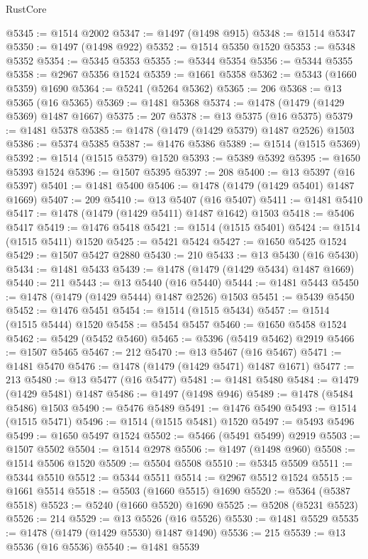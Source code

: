 \begin{lexlean}{RustCore}
\begin{coremodule}
@5345 := @1514 @2002
@5347 := @1497 (@1498 @915)
@5348 := @1514 @5347
@5350 := @1497 (@1498 @922)
@5352 := @1514 @5350 @1520
@5353 := @5348 @5352
@5354 := @5345 @5353
@5355 := @5344 @5354
@5356 := @5344 @5355
@5358 := @2967 @5356 @1524
@5359 := @1661 @5358
@5362 := @5343 (@1660 @5359) @1690
@5364 := @5241 (@5264 @5362)
@5365 := 206
@5368 := @13 @5365 (@16 @5365)
@5369 := @1481 @5368
@5374 := @1478 (@1479 (@1429 @5369) @1487 @1667)
@5375 := 207
@5378 := @13 @5375 (@16 @5375)
@5379 := @1481 @5378
@5385 := @1478 (@1479 (@1429 @5379) @1487 @2526) @1503
@5386 := @5374 @5385
@5387 := @1476 @5386
@5389 := @1514 (@1515 @5369)
@5392 := @1514 (@1515 @5379) @1520
@5393 := @5389 @5392
@5395 := @1650 @5393 @1524
@5396 := @1507 @5395
@5397 := 208
@5400 := @13 @5397 (@16 @5397)
@5401 := @1481 @5400
@5406 := @1478 (@1479 (@1429 @5401) @1487 @1669)
@5407 := 209
@5410 := @13 @5407 (@16 @5407)
@5411 := @1481 @5410
@5417 := @1478 (@1479 (@1429 @5411) @1487 @1642) @1503
@5418 := @5406 @5417
@5419 := @1476 @5418
@5421 := @1514 (@1515 @5401)
@5424 := @1514 (@1515 @5411) @1520
@5425 := @5421 @5424
@5427 := @1650 @5425 @1524
@5429 := @1507 @5427 @2880
@5430 := 210
@5433 := @13 @5430 (@16 @5430)
@5434 := @1481 @5433
@5439 := @1478 (@1479 (@1429 @5434) @1487 @1669)
@5440 := 211
@5443 := @13 @5440 (@16 @5440)
@5444 := @1481 @5443
@5450 := @1478 (@1479 (@1429 @5444) @1487 @2526) @1503
@5451 := @5439 @5450
@5452 := @1476 @5451
@5454 := @1514 (@1515 @5434)
@5457 := @1514 (@1515 @5444) @1520
@5458 := @5454 @5457
@5460 := @1650 @5458 @1524
@5462 := @5429 (@5452 @5460)
@5465 := @5396 (@5419 @5462) @2919
@5466 := @1507 @5465
@5467 := 212
@5470 := @13 @5467 (@16 @5467)
@5471 := @1481 @5470
@5476 := @1478 (@1479 (@1429 @5471) @1487 @1671)
@5477 := 213
@5480 := @13 @5477 (@16 @5477)
@5481 := @1481 @5480
@5484 := @1479 (@1429 @5481) @1487
@5486 := @1497 (@1498 @946)
@5489 := @1478 (@5484 @5486) @1503
@5490 := @5476 @5489
@5491 := @1476 @5490
@5493 := @1514 (@1515 @5471)
@5496 := @1514 (@1515 @5481) @1520
@5497 := @5493 @5496
@5499 := @1650 @5497 @1524
@5502 := @5466 (@5491 @5499) @2919
@5503 := @1507 @5502
@5504 := @1514 @2978
@5506 := @1497 (@1498 @960)
@5508 := @1514 @5506 @1520
@5509 := @5504 @5508
@5510 := @5345 @5509
@5511 := @5344 @5510
@5512 := @5344 @5511
@5514 := @2967 @5512 @1524
@5515 := @1661 @5514
@5518 := @5503 (@1660 @5515) @1690
@5520 := @5364 (@5387 @5518)
@5523 := @5240 (@1660 @5520) @1690
@5525 := @5208 (@5231 @5523)
@5526 := 214
@5529 := @13 @5526 (@16 @5526)
@5530 := @1481 @5529
@5535 := @1478 (@1479 (@1429 @5530) @1487 @1490)
@5536 := 215
@5539 := @13 @5536 (@16 @5536)
@5540 := @1481 @5539

\end{coremodule}
\end{lexlean}
